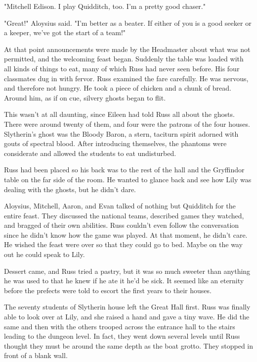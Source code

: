 \documentclass[a4paper,11pt]{article}
\begin{document}
"Mitchell Edison. I play Quidditch, too. I'm a pretty good chaser."

"Great!" Aloysius said. "I'm better as a beater. If either of you is a good seeker or a keeper, we've got the start of a team!"

At that point announcements were made by the Headmaster about what was not permitted, and the welcoming feast began. Suddenly the table was loaded with all kinds of things to eat, many of which Russ had never seen before. His four classmates dug in with fervor. Russ examined the fare carefully. He was nervous, and therefore not hungry. He took a piece of chicken and a chunk of bread. Around him, as if on cue, silvery ghosts began to flit.

This wasn't at all daunting, since Eileen had told Russ all about the ghosts. There were around twenty of them, and four were the patrons of the four houses. Slytherin's ghost was the Bloody Baron, a stern, taciturn spirit adorned with gouts of spectral blood. After introducing themselves, the phantoms were considerate and allowed the students to eat undisturbed.

Russ had been placed so his back was to the rest of the hall and the Gryffindor table on the far side of the room. He wanted to glance back and see how Lily was dealing with the ghosts, but he didn't dare.

Aloysius, Mitchell, Aaron, and Evan talked of nothing but Quidditch for the entire feast. They discussed the national teams, described games they watched, and bragged of their own abilities. Russ couldn't even follow the conversation since he didn't know how the game was played. At that moment, he didn't care. He wished the feast were over so that they could go to bed. Maybe on the way out he could speak to Lily.

Dessert came, and Russ tried a pastry, but it was so much sweeter than anything he was used to that he knew if he ate it he'd be sick. It seemed like an eternity before the prefects were told to escort the first years to their houses.

The seventy students of Slytherin house left the Great Hall first. Russ was finally able to look over at Lily, and she raised a hand and gave a tiny wave. He did the same and then with the others trooped across the entrance hall to the stairs leading to the dungeon level. In fact, they went down several levels until Russ thought they must be around the same depth as the boat grotto. They stopped in front of a blank wall.
\end{document}
